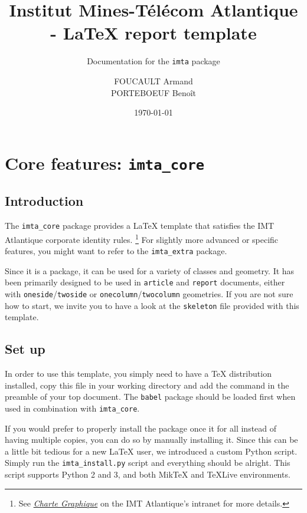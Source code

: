 \documentclass{report}
\author{FOUCAULT Armand\\PORTEBOEUF Benoît}
\date{\noexpand\today}
\title{Institut Mines-Télécom Atlantique - \LaTeX{} report template}
\subtitle{Documentation for the \texttt{imta} package}
\begin{document}
	
\imtaMaketitlepage

\tableofcontents

\newpage




\chapter{Core features: \texttt{imta\_core}}


\section{Introduction}
The \texttt{imta\_core} package provides a \LaTeX{} template that satisfies the IMT Atlantique corporate identity rules.
\footnote{See \textit{\href{https://intranet.imt-atlantique.fr/wp-content/uploads/2017/01/imt_atlantique_chartegraphique.pdf}{Charte Graphique}} on the IMT Atlantique's intranet for more details.} 
For slightly more advanced or specific features, you might want to refer to the \texttt{imta\_extra} package.

Since it is a package, it can be used for a variety of classes and geometry. 
It has been primarily designed to be used in \texttt{article} and \texttt{report} documents, either with \texttt{oneside}/\texttt{twoside} or \texttt{onecolumn}/\texttt{twocolumn} geometries. 
If you are not sure how to start, we invite you to have a look at the \texttt{skeleton} file provided with this template.


\section{Set up}
In order to use this template, you simply need to have a \TeX{} distribution installed, copy this file in your working directory and add the  command in the preamble of your top document. 
The \texttt{babel} package should be loaded first when used in combination with \texttt{imta\_core}.

If you would prefer to properly install the package once it for all instead of having multiple copies, you can do so by manually installing it. 
Since this can be a little bit tedious for a new \LaTeX{} user, we introduced a custom Python script. 
Simply run the \texttt{imta\_install.py} script and everything should be alright.
This script supports Python 2 and 3, and both Mik\TeX{} and \TeX{}Live environments. 
\end{document}
